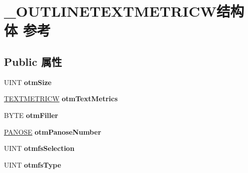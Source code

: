 \hypertarget{struct___o_u_t_l_i_n_e_t_e_x_t_m_e_t_r_i_c_w}{}\section{\+\_\+\+O\+U\+T\+L\+I\+N\+E\+T\+E\+X\+T\+M\+E\+T\+R\+I\+C\+W结构体 参考}
\label{struct___o_u_t_l_i_n_e_t_e_x_t_m_e_t_r_i_c_w}
\subsection*{Public 属性}
\begin{DoxyCompactItemize}
\item 
\mbox{\label{struct___o_u_t_l_i_n_e_t_e_x_t_m_e_t_r_i_c_w_a8c420c2923eed8f17a007248ac5b12eb}} 
U\+I\+NT {\bfseries otm\+Size}
\item 
\mbox{\label{struct___o_u_t_l_i_n_e_t_e_x_t_m_e_t_r_i_c_w_adfbf806dabc9aaa222cfb8fbf307670b}} 
\hyperlink{structtag_t_e_x_t_m_e_t_r_i_c_w}{T\+E\+X\+T\+M\+E\+T\+R\+I\+CW} {\bfseries otm\+Text\+Metrics}
\item 
\mbox{\label{struct___o_u_t_l_i_n_e_t_e_x_t_m_e_t_r_i_c_w_aeb51a5aac3e9579f7d80803d4aeb1d9e}} 
B\+Y\+TE {\bfseries otm\+Filler}
\item 
\mbox{\label{struct___o_u_t_l_i_n_e_t_e_x_t_m_e_t_r_i_c_w_a300d4388d38e2622777bc3732945ff2c}} 
\hyperlink{structtag_p_a_n_o_s_e}{P\+A\+N\+O\+SE} {\bfseries otm\+Panose\+Number}
\item 
\mbox{\label{struct___o_u_t_l_i_n_e_t_e_x_t_m_e_t_r_i_c_w_a9654f12fe6418db690aec02285363a9f}} 
U\+I\+NT {\bfseries otmfs\+Selection}
\item 
\mbox{\label{struct___o_u_t_l_i_n_e_t_e_x_t_m_e_t_r_i_c_w_a1cf03d47ad2acdb2b97d2c7a18280f41}} 
U\+I\+NT {\bfseries otmfs\+Type}
\item 
\mbox{\label{struct___o_u_t_l_i_n_e_t_e_x_t_m_e_t_r_i_c_w_a588ce97eef8e720d52d7d319bcbf099a}} 

\end{DoxyCompactItemize}
